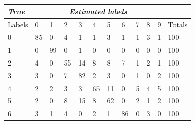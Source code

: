 \documentclass{article}
\begin{document}
\begin{table}[H]
  \small
  \centering
    \begin{tabular}{l|llllllllll|l|}
    \hline
    \emph{True}  & \multicolumn{10}{c}{\emph{Estimated labels}}                                         &  \\
    \hline
    Labels & \multicolumn{1}{l}{0} & \multicolumn{1}{l}{1} & \multicolumn{1}{l}{2} & \multicolumn{1}{l}{3} & \multicolumn{1}{l}{4} & \multicolumn{1}{l}{5} & \multicolumn{1}{l}{6} & \multicolumn{1}{l}{7} & \multicolumn{1}{l}{8} & \multicolumn{1}{l}{9} & Totals \\ \hline
    0     & \multicolumn{1}{l}{85} & \multicolumn{1}{l}{0} & \multicolumn{1}{l}{4} & \multicolumn{1}{l}{1} & \multicolumn{1}{l}{1} & \multicolumn{1}{l}{3} & \multicolumn{1}{l}{1} & \multicolumn{1}{l}{1} & \multicolumn{1}{l}{3} & \multicolumn{1}{l}{1} & 100 \\
    1     & \multicolumn{1}{l}{0} & \multicolumn{1}{l}{99} & \multicolumn{1}{l}{0} & \multicolumn{1}{l}{1} & \multicolumn{1}{l}{0} & \multicolumn{1}{l}{0} & \multicolumn{1}{l}{0} & \multicolumn{1}{l}{0} & \multicolumn{1}{l}{0} & \multicolumn{1}{l}{0} & 100 \\
    2     & \multicolumn{1}{l}{4} & \multicolumn{1}{l}{0} & \multicolumn{1}{l}{55} & \multicolumn{1}{l}{14} & \multicolumn{1}{l}{8} & \multicolumn{1}{l}{8} & \multicolumn{1}{l}{7} & \multicolumn{1}{l}{1} & \multicolumn{1}{l}{2} & \multicolumn{1}{l}{1} & 100 \\
    3     & \multicolumn{1}{l}{3} & \multicolumn{1}{l}{0} & \multicolumn{1}{l}{7} & \multicolumn{1}{l}{82} & \multicolumn{1}{l}{2} & \multicolumn{1}{l}{3} & \multicolumn{1}{l}{0} & \multicolumn{1}{l}{1} & \multicolumn{1}{l}{0} & \multicolumn{1}{l}{2} & 100 \\
    4     & \multicolumn{1}{l}{2} & \multicolumn{1}{l}{2} & \multicolumn{1}{l}{3} & \multicolumn{1}{l}{3} & \multicolumn{1}{l}{65} & \multicolumn{1}{l}{11} & \multicolumn{1}{l}{0} & \multicolumn{1}{l}{5} & \multicolumn{1}{l}{4} & \multicolumn{1}{l}{5} & 100 \\
    5     & \multicolumn{1}{l}{2} & \multicolumn{1}{l}{0} & \multicolumn{1}{l}{8} & \multicolumn{1}{l}{15} & \multicolumn{1}{l}{8} & \multicolumn{1}{l}{62} & \multicolumn{1}{l}{0} & \multicolumn{1}{l}{2} & \multicolumn{1}{l}{1} & \multicolumn{1}{l}{2} & 100 \\
    6     & \multicolumn{1}{l}{3} & \multicolumn{1}{l}{1} & \multicolumn{1}{l}{4} & \multicolumn{1}{l}{0} & \multicolumn{1}{l}{2} & \multicolumn{1}{l}{1} & \multicolumn{1}{l}{86} & \multicolumn{1}{l}{0} & \multicolumn{1}{l}{3} & \multicolumn{1}{l}{0} & 100 \\

\end{tabular}
\end{table}
\end{document}
